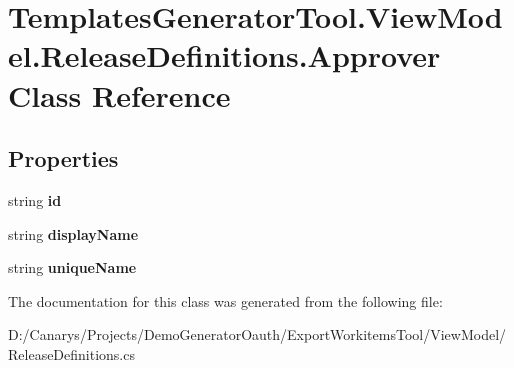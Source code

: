 \hypertarget{class_templates_generator_tool_1_1_view_model_1_1_release_definitions_1_1_approver}{}\section{Templates\+Generator\+Tool.\+View\+Model.\+Release\+Definitions.\+Approver Class Reference}
\label{class_templates_generator_tool_1_1_view_model_1_1_release_definitions_1_1_approver}
\subsection*{Properties}
\begin{DoxyCompactItemize}
\item 
\mbox{\label{class_templates_generator_tool_1_1_view_model_1_1_release_definitions_1_1_approver_aa86607ef167d7c96ec24ef69a4dea706}} 
string {\bfseries id}
\item 
\mbox{\label{class_templates_generator_tool_1_1_view_model_1_1_release_definitions_1_1_approver_a9813382b97c801d7828d7830f77dbd1a}} 
string {\bfseries display\+Name}
\item 
\mbox{\label{class_templates_generator_tool_1_1_view_model_1_1_release_definitions_1_1_approver_ae90b67f67458edd5de824b4c2bdd49ec}} 
string {\bfseries unique\+Name}
\end{DoxyCompactItemize}


The documentation for this class was generated from the following file\+:\begin{DoxyCompactItemize}
\item 
D\+:/\+Canarys/\+Projects/\+Demo\+Generator\+Oauth/\+Export\+Workitems\+Tool/\+View\+Model/Release\+Definitions.\+cs\end{DoxyCompactItemize}
